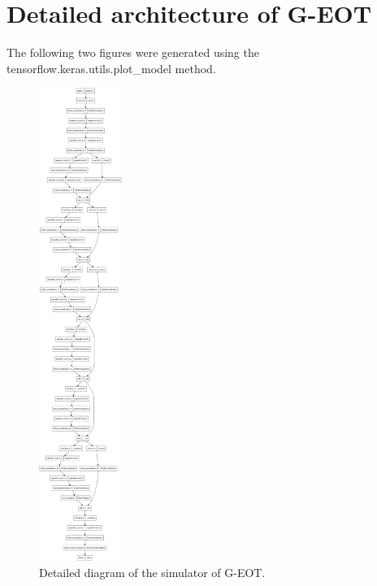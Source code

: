\chapter{Detailed architecture of G-EOT}
    \label{app:detailed_architecture}
    
The following two figures were generated using the tensorflow.keras.utils.plot\_model method.

\begin{figure}[h]
    \centering
    \includegraphics[width=0.24\textwidth]{graphics/detailed_simulator.png}
    \caption{Detailed diagram of the simulator of G-EOT.}
\end{figure}

